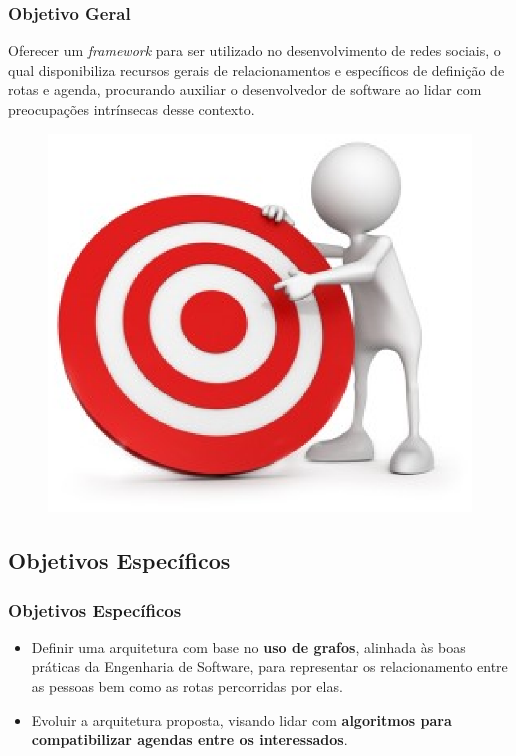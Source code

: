 \documentclass{beamer}
\begin{document}
\begin{frame}
\frametitle{Objetivo Geral}

Oferecer um \textit{framework} para ser utilizado no desenvolvimento de redes sociais, o qual disponibiliza recursos gerais de relacionamentos e específicos de definição de rotas e agenda, procurando auxiliar o desenvolvedor de software ao lidar com preocupações intrínsecas desse contexto.

\begin{figure}[h]
	\centering
	\includegraphics[scale=0.4]{figuras/objective.eps}
\end{figure}

\end{frame}

\subsection{Objetivos Específicos}

\begin{frame}
\frametitle{Objetivos Específicos}

\begin{itemize}
	\item Definir uma arquitetura com base no \textbf{uso de grafos}, alinhada às boas práticas da Engenharia de Software, para representar os relacionamento entre as pessoas bem como as rotas percorridas por elas.
	\item Evoluir a arquitetura proposta, visando lidar com \textbf{algoritmos para compatibilizar agendas entre os interessados}.
\end{itemize}

\end{frame}
\end{document}

